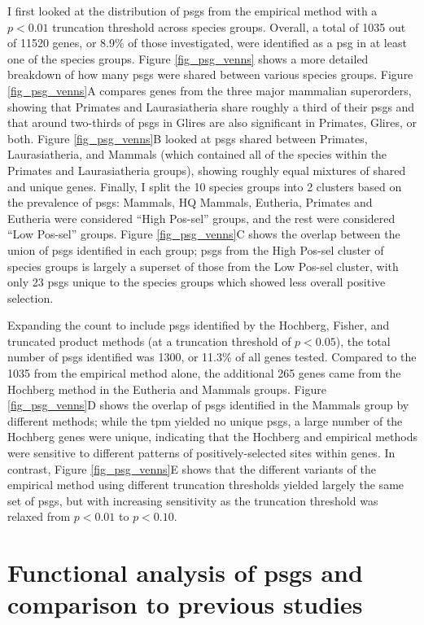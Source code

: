 I first looked at the distribution of \acp{psg} from the empirical
method with a $p<0.01$ truncation threshold across species
groups. Overall, a total of 1035 out of 11520 genes, or 8.9\% of those
investigated, were identified as a \ac{psg} in at least one of the
species groups. Figure \ref{fig_psg_venns} shows a more detailed
breakdown of how many \acp{psg} were shared between various species
groups. Figure \ref{fig_psg_venns}A compares genes from the three
major mammalian superorders, showing that Primates and Laurasiatheria
share roughly a third of their \acp{psg} and that around two-thirds of
\acp{psg} in Glires are also significant in Primates, Glires, or
both. Figure \ref{fig_psg_venns}B looked at \acp{psg} shared between
Primates, Laurasiatheria, and Mammals (which contained all of the
species within the Primates and Laurasiatheria groups), showing
roughly equal mixtures of shared and unique genes. Finally, I split
the 10 species groups into 2 clusters based on the prevalence of
\acp{psg}: Mammals, HQ Mammals, Eutheria, Primates and Eutheria were
considered ``High Pos-sel'' groups, and the rest were considered ``Low
Pos-sel'' groups. Figure \ref{fig_psg_venns}C shows the overlap
between the union of \acp{psg} identified in each group; \acp{psg}
from the High Pos-sel cluster of species groups is largely a superset
of those from the Low Pos-sel cluster, with only 23 \acp{psg} unique
to the species groups which showed less overall positive selection.

Expanding the count to include \acp{psg} identified by the Hochberg,
Fisher, and truncated product methods (at a truncation threshold of
$p<0.05$), the total number of \acp{psg} identified was 1300, or
11.3\% of all genes tested. Compared to the 1035 from the empirical
method alone, the additional 265 genes came from the Hochberg method
in the Eutheria and Mammals groups. Figure \ref{fig_psg_venns}D shows
the overlap of \acp{psg} identified in the Mammals group by different
methods; while the \ac{tpm} yielded no unique \acp{psg}, a large
number of the Hochberg genes were unique, indicating that the Hochberg
and empirical \pv methods were sensitive to different patterns of
positively-selected sites within genes. In contrast, Figure
\ref{fig_psg_venns}E shows that the different variants of the
empirical method using different truncation thresholds yielded largely
the same set of \acp{psg}, but with increasing sensitivity as the
truncation threshold was relaxed from $p<0.01$ to $p<0.10$.

\section{Functional analysis of \acp{psg} and comparison to previous studies}

